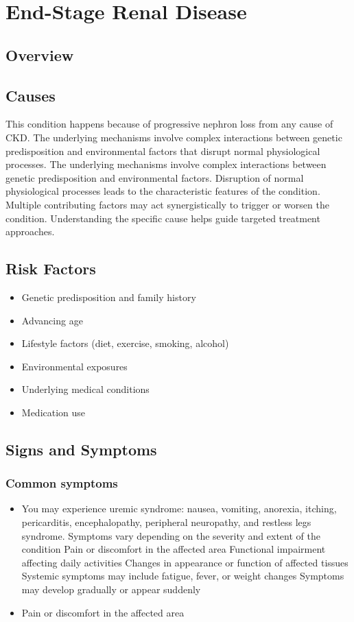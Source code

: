 \chapter{End-Stage Renal Disease}
\label{sec:End-Stage Renal Disease}

\section{Overview}

\section{Causes}
This condition happens because of progressive nephron loss from any cause of CKD. The underlying mechanisms involve complex interactions between genetic predisposition and environmental factors that disrupt normal physiological processes. The underlying mechanisms involve complex interactions between genetic predisposition and environmental factors. Disruption of normal physiological processes leads to the characteristic features of the condition. Multiple contributing factors may act synergistically to trigger or worsen the condition. Understanding the specific cause helps guide targeted treatment approaches.
\section{Risk Factors}


\begin{itemize}[noitemsep]
  \item Genetic predisposition and family history
  \item Advancing age
  \item Lifestyle factors (diet, exercise, smoking, alcohol)
  \item Environmental exposures
  \item Underlying medical conditions
  \item Medication use
\end{itemize}
\section{Signs and Symptoms}

\subsection{Common symptoms}
\begin{itemize}[noitemsep]
  \item You may experience uremic syndrome: nausea, vomiting, anorexia, itching, pericarditis, encephalopathy, peripheral neuropathy, and restless legs syndrome. Symptoms vary depending on the severity and extent of the condition Pain or discomfort in the affected area Functional impairment affecting daily activities Changes in appearance or function of affected tissues Systemic symptoms may include fatigue, fever, or weight changes Symptoms may develop gradually or appear suddenly
  \item Pain or discomfort in the affected area
  \end{itemize}

